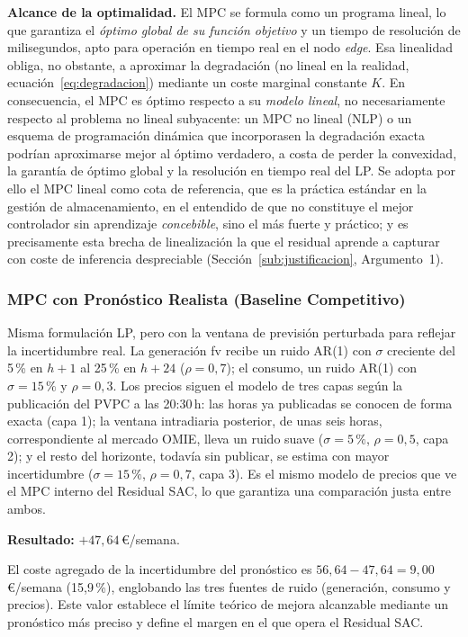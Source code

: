\documentclass[12pt, a4paper, twoside]{report}
\begin{document}
\textbf{Alcance de la optimalidad.} El MPC se formula como un programa lineal, lo
que garantiza el \emph{óptimo global de su función objetivo} y un tiempo de
resolución de milisegundos, apto para operación en tiempo real en el nodo
\textit{edge}. Esa linealidad obliga, no obstante, a aproximar la degradación
(no lineal en la realidad, ecuación~\eqref{eq:degradacion}) mediante un coste
marginal constante $K$. En consecuencia, el MPC es óptimo respecto a su
\emph{modelo lineal}, no necesariamente respecto al problema no lineal subyacente:
un MPC no lineal (NLP) o un esquema de programación dinámica que incorporasen la
degradación exacta podrían aproximarse mejor al óptimo verdadero, a costa de
perder la convexidad, la garantía de óptimo global y la resolución en tiempo real
del LP. Se adopta por ello el MPC lineal como cota de referencia, que es la práctica
estándar en la gestión de almacenamiento, en el entendido de que no constituye
el mejor controlador sin aprendizaje \emph{concebible}, sino el más fuerte y
práctico; y es precisamente esta brecha de linealización la que el residual
aprende a capturar con coste de inferencia despreciable (Sección~\ref{sub:justificacion},
Argumento~1).

\subsubsection{MPC con Pronóstico Realista (Baseline Competitivo)}

Misma formulación LP, pero con la ventana de previsión perturbada para reflejar
la incertidumbre real. La generación \acrshort{fv} recibe un ruido AR(1) con
$\sigma$ creciente del 5\,\% en $h{+}1$ al 25\,\% en $h{+}24$ ($\rho=0{,}7$); el
consumo, un ruido AR(1) con $\sigma=15\,\%$ y $\rho=0{,}3$. Los precios siguen
el modelo de tres capas según la publicación del PVPC a las 20:30\,h: las horas
ya publicadas se conocen de forma exacta (capa 1); la ventana intradiaria
posterior, de unas seis horas, correspondiente al mercado OMIE, lleva un ruido
suave ($\sigma=5\,\%$, $\rho=0{,}5$, capa 2); y el resto del horizonte, todavía
sin publicar, se estima con mayor incertidumbre ($\sigma=15\,\%$, $\rho=0{,}7$,
capa 3). Es el mismo modelo de precios que ve el MPC interno del Residual SAC,
lo que garantiza una comparación justa entre ambos.

\textbf{Resultado:} $+47{,}64$\,€/semana.

El coste agregado de la incertidumbre del pronóstico es
$56{,}64 - 47{,}64 = 9{,}00$\,€/semana (15{,}9\,\%), englobando las tres
fuentes de ruido (generación, consumo y precios). Este valor establece el
límite teórico de mejora alcanzable mediante un pronóstico más preciso y define
el margen en el que opera el Residual SAC.
\end{document}
